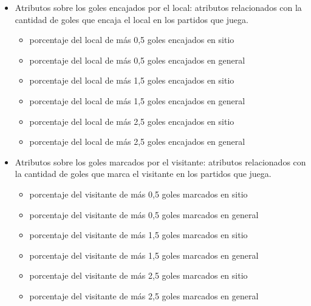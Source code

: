 \begin{itemize}
    \item Atributos sobre los goles encajados por el local: atributos relacionados con la cantidad de goles que encaja el local en los partidos que juega.
          \begin{itemize}
              \item porcentaje del local de más 0,5 goles encajados en sitio
              \item porcentaje del local de más 0,5 goles encajados en general
              \item porcentaje del local de más 1,5 goles encajados en sitio
              \item porcentaje del local de más 1,5 goles encajados en general
              \item porcentaje del local de más 2,5 goles encajados en sitio
              \item porcentaje del local de más 2,5 goles encajados en general
          \end{itemize}
    \item Atributos sobre los goles marcados por el visitante: atributos relacionados con la cantidad de goles que marca el visitante en los partidos que juega.
          \begin{itemize}
              \item porcentaje del visitante de más 0,5 goles marcados en sitio
              \item porcentaje del visitante de más 0,5 goles marcados en general
              \item porcentaje del visitante de más 1,5 goles marcados en sitio
              \item porcentaje del visitante de más 1,5 goles marcados en general
              \item porcentaje del visitante de más 2,5 goles marcados en sitio
              \item porcentaje del visitante de más 2,5 goles marcados en general


\end{itemize}
\end{itemize}

